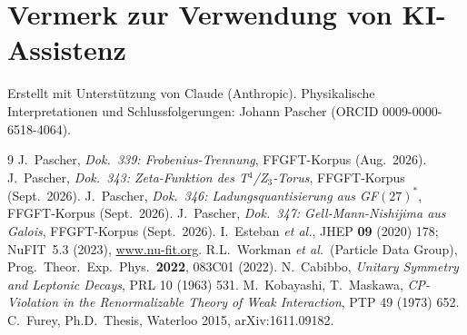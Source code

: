 \section*{Vermerk zur Verwendung von KI-Assistenz}
Erstellt mit Unterstützung von Claude (Anthropic).
Physikalische Interpretationen und Schlussfolgerungen:
Johann Pascher (ORCID 0009-0000-6518-4064).

\begin{thebibliography}{9}
 J.~Pascher, \textit{Dok.~339: Frobenius-Trennung}, FFGFT-Korpus (Aug.\ 2026).
 J.~Pascher, \textit{Dok.~343: Zeta-Funktion des T$^4$/Z$_3$-Torus}, FFGFT-Korpus (Sept.\ 2026).
 J.~Pascher, \textit{Dok.~346: Ladungsquantisierung aus GF$(27)^*$}, FFGFT-Korpus (Sept.\ 2026).
 J.~Pascher, \textit{Dok.~347: Gell-Mann-Nishijima aus Galois}, FFGFT-Korpus (Sept.\ 2026).
 I.~Esteban \emph{et al.}, JHEP \textbf{09} (2020) 178;
NuFIT~5.3 (2023), \url{www.nu-fit.org}.
 R.L.~Workman \emph{et al.}\ (Particle Data Group),
Prog.\ Theor.\ Exp.\ Phys.\ \textbf{2022}, 083C01 (2022).
 N.~Cabibbo, \textit{Unitary Symmetry and Leptonic Decays}, PRL 10 (1963) 531.
 M.~Kobayashi, T.~Maskawa, \textit{CP-Violation in the Renormalizable Theory of Weak Interaction}, PTP 49 (1973) 652.
 C.~Furey, Ph.D.\ Thesis, Waterloo 2015, arXiv:1611.09182.
\end{thebibliography}
